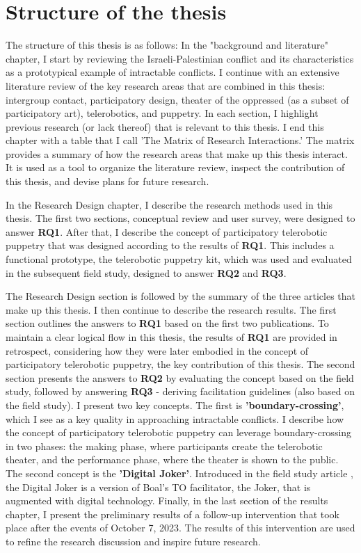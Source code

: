 \documentclass[dissertation,math,vertlayout,pdfa,colorlinks]{aaltoseries}
\begin{document}
\section{Structure of the thesis}
The structure of this thesis is as follows: In the "background and literature" chapter, I start by reviewing the Israeli-Palestinian conflict and its characteristics as a prototypical example of intractable conflicts. I continue with an extensive literature review of the key research areas that are combined in this thesis: intergroup contact, participatory design, theater of the oppressed (as a subset of participatory art), telerobotics, and puppetry. In each section, I highlight previous research (or lack thereof) that is relevant to this thesis. I end this chapter with a table that I call 'The Matrix of Research Interactions.' The matrix provides a summary of how the research areas that make up this thesis interact. It is used as a tool to organize the literature review, inspect the contribution of this thesis, and devise plans for future research.

In the Research Design chapter, I describe the research methods used in this thesis. The first two sections, conceptual review and user survey, were designed to answer \textbf{RQ1}. After that, I describe the concept of participatory telerobotic puppetry that was designed according to the results of \textbf{RQ1}. This includes a functional prototype, the telerobotic puppetry kit, which was used and evaluated in the subsequent field study, designed to answer \textbf{RQ2} and \textbf{RQ3}.

The Research Design section is followed by the summary of the three articles that make up this thesis. I then continue to describe the research results. The first section outlines the answers to \textbf{RQ1} based on the first two publications. To maintain a clear logical flow in this thesis, the results of \textbf{RQ1} are provided in retrospect, considering how they were later embodied in the concept of participatory telerobotic puppetry, the key contribution of this thesis. The second section presents the answers to \textbf{RQ2} by evaluating the concept based on the field study, followed by answering \textbf{RQ3} - deriving facilitation guidelines (also based on the field study). I present two key concepts. The first is \textbf{'boundary-crossing'}, which I see as a key quality in approaching intractable conflicts. I describe how the concept of participatory telerobotic puppetry can leverage boundary-crossing in two phases: the making phase, where participants create the telerobotic theater, and the performance phase, where the theater is shown to the public. The second concept is the \textbf{'Digital Joker'}. Introduced in the field study article \cite{peledTeleroboticTheaterOppressed2025}, the Digital Joker is a version of Boal's TO facilitator, the Joker, that is augmented with digital technology. Finally, in the last section of the results chapter, I present the preliminary results of a follow-up intervention that took place after the events of October 7, 2023. The results of this intervention are used to refine the research discussion and inspire future research.
\end{document}
